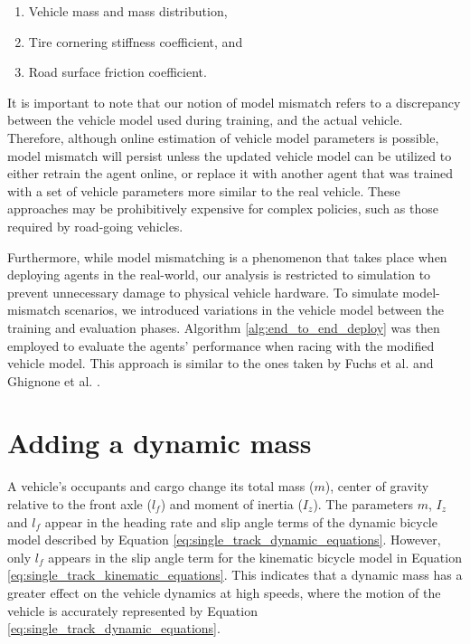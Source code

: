 \begin{enumerate}
\item Vehicle mass and mass distribution,
\item Tire cornering stiffness coefficient, and
\item Road surface friction coefficient.
\end{enumerate}


It is important to note that our notion of model mismatch refers to a discrepancy between the vehicle model used during training, and the actual vehicle.
Therefore, although online estimation of vehicle model parameters is possible, model mismatch will persist unless the updated vehicle model can be utilized to either retrain the agent online, or replace it with another agent that was trained with a set of vehicle parameters more similar to the real vehicle.
These approaches may be prohibitively expensive for complex policies, such as those required by road-going vehicles.

Furthermore, while model mismatching is a phenomenon that takes place when deploying agents in the real-world, our analysis is restricted to simulation to prevent unnecessary damage to physical vehicle hardware.
To simulate model-mismatch scenarios, we introduced variations in the vehicle model between the training and evaluation phases.
Algorithm \ref{alg:end_to_end_deploy} was then employed to evaluate the agents' performance when racing with the modified vehicle model.
This approach is similar to the ones taken by Fuchs et al. \cite{Fuchs2021} and Ghignone et al. \cite{Ghignone2022}.


\section{Adding a dynamic mass}

A vehicle's occupants and cargo change its total mass ($m$), center of gravity relative to the front axle ($l_f$) and moment of inertia ($I_z$).
The parameters $m$, $I_z$ and $l_f$ appear in the heading rate and slip angle terms of the dynamic bicycle model described by Equation \ref{eq:single_track_dynamic_equations}.
However, only $l_f$ appears in the slip angle term for the kinematic bicycle model in Equation \ref{eq:single_track_kinematic_equations}.
This indicates that a dynamic mass has a greater effect on the vehicle dynamics at high speeds, where the motion of the vehicle is accurately represented by Equation \ref{eq:single_track_dynamic_equations}.


